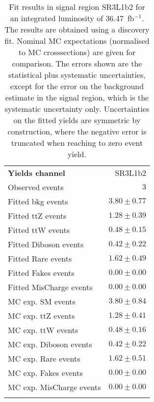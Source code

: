 

\begin{table}
\begin{center}
\setlength{\tabcolsep}{0.0pc}
{\small
\begin{tabular*}{\textwidth}{@{\extracolsep{\fill}}lr}
\noalign{\smallskip}\hline\noalign{\smallskip}
{\bfseries Yields channel}           & SR3L1b2              \\[-0.05cm]
\noalign{\smallskip}\hline\noalign{\smallskip}
Observed events          & $3$                    \\
\noalign{\smallskip}\hline\noalign{\smallskip}
Fitted bkg events         & $3.80 \pm 0.77$              \\
\noalign{\smallskip}\hline\noalign{\smallskip}
        Fitted ttZ events         & $1.28 \pm 0.39$              \\
        Fitted ttW events         & $0.48 \pm 0.15$              \\
        Fitted Diboson events         & $0.42 \pm 0.22$              \\
        Fitted Rare events         & $1.62 \pm 0.49$              \\
        Fitted Fakes events         & $0.00 \pm 0.00$              \\
        Fitted MisCharge events         & $0.00 \pm 0.00$              \\
 \noalign{\smallskip}\hline\noalign{\smallskip}
MC exp. SM events              & $3.80 \pm 0.84$              \\
\noalign{\smallskip}\hline\noalign{\smallskip}
        MC exp. ttZ events         & $1.28 \pm 0.41$              \\
        MC exp. ttW events         & $0.48 \pm 0.16$              \\
        MC exp. Diboson events         & $0.42 \pm 0.22$              \\
        MC exp. Rare events         & $1.62 \pm 0.51$              \\
        MC exp. Fakes events         & $0.00 \pm 0.00$              \\
        MC exp. MisCharge events         & $0.00 \pm 0.00$              \\
\noalign{\smallskip}\hline\noalign{\smallskip}
\end{tabular*}
}
\end{center}
\caption{Fit results in signal region SR3L1b2 for an integrated luminosity of 36.47~fb$^{-1}$.
The results are obtained using a discovery fit. Nominal MC expectations (normalised to MC crosssections) are given for comparison. 
The errors shown are the statistical plus systematic uncertainties, except for the error on the background estimate in the signal region, which is the systematic uncertainty only.
Uncertainties on the fitted yields are symmetric by construction, where the negative error is truncated when reaching to zero event yield.
}
\label{table.results.systematics.in.logL.fit..Yields.SR3L1b2}
\end{table}
\clearpage
%
